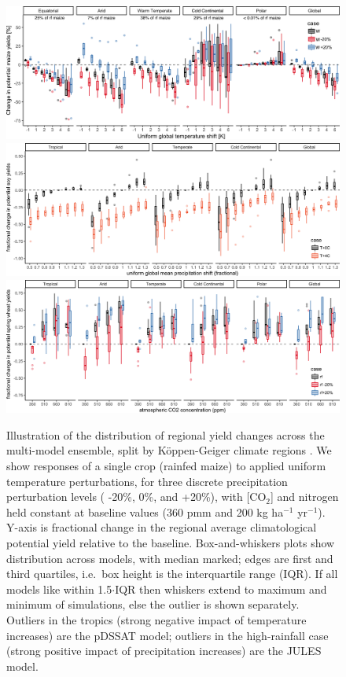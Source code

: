 \documentclass[gmd, manuscript]{copernicus} %
\begin{document}
\begin{figure}[ht]
\centering
   \includegraphics[width=15cm]{figures/global_sim_CG.png}
   \includegraphics[width=15cm]{figures/soy_sim_CG_W.png}
   \includegraphics[width=15cm]{figures/swh_sim_CG_C.png}
   \caption{Illustration of the distribution of regional yield changes across the multi-model ensemble, split by K\"{o}ppen-Geiger climate regions \citep{rubel2010}. 
   We show responses of a single crop (rainfed maize) to applied uniform temperature perturbations, for three discrete precipitation perturbation levels ( -20\%, 0\%, and +20\%), with [CO$_2$] and nitrogen held constant at baseline values (360 pmm and 200 kg ha$^{-1}$ yr$^{-1}$). 
	Y-axis is fractional change in the regional average climatological potential yield relative to the baseline. Box-and-whiskers plots show distribution across models, with median marked; edges are first and third quartiles, i.e.\ box height is the interquartile range (IQR). 
	If all models like within 1.5$\cdot$IQR then whiskers extend to maximum and minimum of simulations, else the outlier is shown separately. Outliers in the tropics (strong negative impact of temperature increases) are the pDSSAT model; outliers in the high-rainfall case (strong positive impact of precipitation increases) are the JULES model. 
}
\end{figure}
\end{document}
